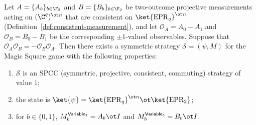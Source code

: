 \begin{theorem}\label{thm:ms-from-ac}
	\leanok
	Let $A = \{A_b\}_{b \in \F_2}$ and $B = \{B_b\}_{b \in \F_2}$ be two-outcome projective measurements acting on $(\C^q)^{\ot n}$ that are consistent on $\ket{\mathrm{EPR}_q}^{\ot n}$ (Definition~\ref{def:consistent-measurement}), and let $\mathcal O_A = A_0 - A_1$ and $\mathcal O_B = B_0 - B_1$ be the corresponding $\pm 1$-valued observables. Suppose that $\mathcal O_A \mathcal O_B = - \mathcal O_B \mathcal O_A$. Then there exists a symmetric strategy $\mathcal S = (\psi, M)$ for the Magic Square game with the following properties:
	\begin{enumerate}
		\item $\mathcal S$ is an SPCC (symmetric, projective, consistent, commuting) strategy of value $1$;
		\item the state is $\ket{\psi} = \ket{\mathrm{EPR}_q}^{\ot n} \ot \ket{\mathrm{EPR}_2}$;
		\item for $b \in \{0,1\}$, $M^{\mathsf{Variable}_1}_b = A_b \ot I$ and $M^{\mathsf{Variable}_5}_b = B_b \ot I$.
	\end{enumerate}
\end{theorem}
